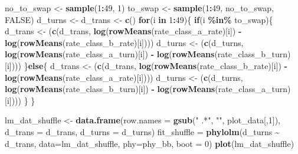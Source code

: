 \documentclass[
]{article}
\newenvironment{Shaded}{\begin{snugshade}}{\end{snugshade}}
\newcommand{\AttributeTok}[1]{\textcolor[rgb]{0.13,0.29,0.53}{#1}}
\newcommand{\ConstantTok}[1]{\textcolor[rgb]{0.56,0.35,0.01}{#1}}
\newcommand{\ControlFlowTok}[1]{\textcolor[rgb]{0.13,0.29,0.53}{\textbf{#1}}}
\newcommand{\DecValTok}[1]{\textcolor[rgb]{0.00,0.00,0.81}{#1}}
\newcommand{\FunctionTok}[1]{\textcolor[rgb]{0.13,0.29,0.53}{\textbf{#1}}}
\newcommand{\NormalTok}[1]{#1}
\newcommand{\OtherTok}[1]{\textcolor[rgb]{0.56,0.35,0.01}{#1}}
\newcommand{\SpecialCharTok}[1]{\textcolor[rgb]{0.81,0.36,0.00}{\textbf{#1}}}
\newcommand{\StringTok}[1]{\textcolor[rgb]{0.31,0.60,0.02}{#1}}
\begin{document}
\begin{Shaded}
\begin{Highlighting}[]
\NormalTok{no\_to\_swap }\OtherTok{\textless{}{-}} \FunctionTok{sample}\NormalTok{(}\DecValTok{1}\SpecialCharTok{:}\DecValTok{49}\NormalTok{, }\DecValTok{1}\NormalTok{)}
\NormalTok{to\_swap }\OtherTok{\textless{}{-}} \FunctionTok{sample}\NormalTok{(}\DecValTok{1}\SpecialCharTok{:}\DecValTok{49}\NormalTok{, no\_to\_swap, }\ConstantTok{FALSE}\NormalTok{)}
\NormalTok{d\_turns }\OtherTok{\textless{}{-}}\NormalTok{ d\_trans }\OtherTok{\textless{}{-}} \FunctionTok{c}\NormalTok{()}
\ControlFlowTok{for}\NormalTok{(i }\ControlFlowTok{in} \DecValTok{1}\SpecialCharTok{:}\DecValTok{49}\NormalTok{)\{}
  \ControlFlowTok{if}\NormalTok{(i }\SpecialCharTok{\%in\%}\NormalTok{ to\_swap)\{}
\NormalTok{    d\_trans }\OtherTok{\textless{}{-}}\NormalTok{ (}\FunctionTok{c}\NormalTok{(d\_trans, }\FunctionTok{log}\NormalTok{(}\FunctionTok{rowMeans}\NormalTok{(rate\_class\_a\_rate)[i]) }\SpecialCharTok{{-}} 
                    \FunctionTok{log}\NormalTok{(}\FunctionTok{rowMeans}\NormalTok{(rate\_class\_b\_rate)[i])))}
\NormalTok{    d\_turns }\OtherTok{\textless{}{-}}\NormalTok{ (}\FunctionTok{c}\NormalTok{(d\_turns, }\FunctionTok{log}\NormalTok{(}\FunctionTok{rowMeans}\NormalTok{(rate\_class\_a\_turn)[i]) }\SpecialCharTok{{-}} 
                    \FunctionTok{log}\NormalTok{(}\FunctionTok{rowMeans}\NormalTok{(rate\_class\_b\_turn)[i])))}
\NormalTok{  \}}\ControlFlowTok{else}\NormalTok{\{}
\NormalTok{    d\_trans }\OtherTok{\textless{}{-}}\NormalTok{ (}\FunctionTok{c}\NormalTok{(d\_trans, }\FunctionTok{log}\NormalTok{(}\FunctionTok{rowMeans}\NormalTok{(rate\_class\_b\_rate)[i]) }\SpecialCharTok{{-}} 
                    \FunctionTok{log}\NormalTok{(}\FunctionTok{rowMeans}\NormalTok{(rate\_class\_a\_rate)[i])))}
\NormalTok{    d\_turns }\OtherTok{\textless{}{-}}\NormalTok{ (}\FunctionTok{c}\NormalTok{(d\_turns, }\FunctionTok{log}\NormalTok{(}\FunctionTok{rowMeans}\NormalTok{(rate\_class\_b\_turn)[i]) }\SpecialCharTok{{-}} 
                    \FunctionTok{log}\NormalTok{(}\FunctionTok{rowMeans}\NormalTok{(rate\_class\_a\_turn)[i])))}
\NormalTok{  \}}
\NormalTok{\}}

\NormalTok{lm\_dat\_shuffle }\OtherTok{\textless{}{-}} \FunctionTok{data.frame}\NormalTok{(}\AttributeTok{row.names =} \FunctionTok{gsub}\NormalTok{(}\StringTok{" .*"}\NormalTok{, }\StringTok{""}\NormalTok{, plot\_data[,}\DecValTok{1}\NormalTok{]),}
                     \AttributeTok{d\_trans =}\NormalTok{ d\_trans,}
                     \AttributeTok{d\_turns =}\NormalTok{ d\_turns)}
\NormalTok{fit\_shuffle }\OtherTok{=} \FunctionTok{phylolm}\NormalTok{(d\_turns }\SpecialCharTok{\textasciitilde{}}\NormalTok{ d\_trans, }\AttributeTok{data=}\NormalTok{lm\_dat\_shuffle, }\AttributeTok{phy=}\NormalTok{phy\_bb, }\AttributeTok{boot =} \DecValTok{0}\NormalTok{)}
\FunctionTok{plot}\NormalTok{(lm\_dat\_shuffle)}
\end{Highlighting}
\end{Shaded}
\end{document}
